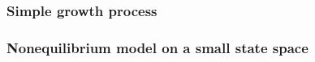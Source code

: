 \subsubsection{Simple growth process}



\subsubsection{Nonequilibrium model on a small state space}



